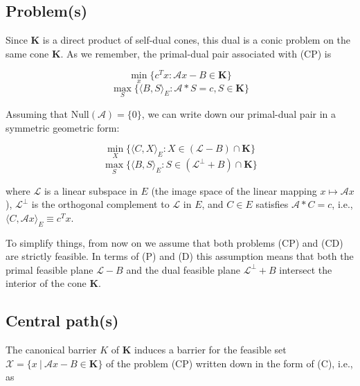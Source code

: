 \documentclass[11pt,a4paper]{article}
\newcommand{\X}{\mathcal{X}}
\begin{document}
\subsection{Problem(s)}

Since $\textbf{K}$ is a direct product of self-dual cones, this dual is a conic problem on the same cone $\textbf{K}$. As we remember, the primal-dual pair associated with (CP) is

\begin{equation}
    \underset{x}{\min} \{c^Tx : \mathcal{A}x-B \in \textbf{K}\} \tag{CP}
\end{equation}
\begin{equation}
    \underset{S}{\max} \{\langle B,S \rangle_E : \mathcal{A}*S = c, S \in \textbf{K}\} \tag{CD}
\end{equation}

Assuming that $\text{Null}(\mathcal{A}) = \{0\}$, we can write down our primal-dual pair in a symmetric geometric form:

\begin{equation}
    \underset{X}{\min} \{\langle C,X \rangle_E : X \in (\mathcal{L}-B) \cap \textbf{K}\} \tag{P}
\end{equation}
\begin{equation}
    \underset{S}{\max} \{\langle B,S \rangle_E : S \in (\mathcal{L}^\perp+B) \cap \textbf{K}\} \tag{D}
\end{equation}

where $\mathcal{L}$ is a linear subspace in $E$ (the image space of the linear mapping $x \mapsto \mathcal{A}x$), $\mathcal{L}^\perp$ is the orthogonal complement to $\mathcal{L}$ in $E$, and $C \in E$ satisfies $\mathcal{A}*C = c$, i.e., $\langle C,\mathcal{A}x \rangle_E \equiv c^Tx$.

To simplify things, from now on we assume that both problems (CP) and (CD) are strictly feasible. In terms of (P) and (D) this assumption means that both the primal feasible plane $\mathcal{L}-B$ and the dual feasible plane $\mathcal{L}^\perp+B$ intersect the interior of the cone $\textbf{K}$.

\subsection{Central path(s)}

The canonical barrier $K$ of $\textbf{K}$ induces a barrier for the feasible set $\X = \{x \ |\ \mathcal{A}x - B \in \textbf{K}\}$ of the problem (CP) written down in the form of (C), i.e., as
\end{document}
